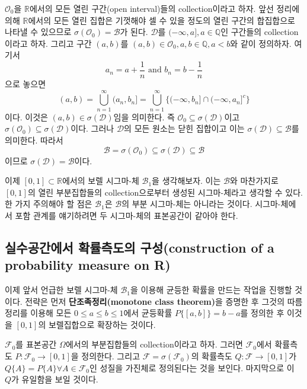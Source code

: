 \documentclass[b5paper,]{book}
\theoremstyle{definition}
\theoremstyle{definition}
\theoremstyle{definition}
\theoremstyle{remark}
\let\BeginKnitrBlock\begin \let\EndKnitrBlock\end
\begin{document}
\BeginKnitrBlock{exercise}[실수 구간에서의 보렐 시그마-체의 생성의 증명]
\protect\hypertarget{exr:unnamed-chunk-32}{}{\label{exr:unnamed-chunk-32}
{}
}\(\mathcal{O}_{0}\)을 \(\mathbb{R}\)에서의 모든 열린 구간(open
interval)들의 collection이라고 하자. 앞선 정리에 의해
\(\mathbb{R}\)에서의 모든 열린 집합은 기껏해야 셀 수 있을 정도의 열린
구간의 합집합으로 나타낼 수 있으므로
\(\sigma(\mathcal{O}_{0})=\mathcal{B}\)가 된다. \(\mathcal{D}\)를
\((-\infty, a], a\in \mathbb{Q}\)인 구간들의 collection이라고 하자.
그리고 구간 \((a,b)\)를
\((a,b)\in \mathcal{O}_{0}, a,b \in \mathbb{Q}, a<b\)와 같이 정의하자.
여기서 \[a_{n}=a+\frac{1}{n} \text{ and } b_{n}=b-\frac{1}{n}\] 으로
놓으면
\[(a,b)=\bigcup_{n=1}^{\infty}(a_{n},b_{n}]=\bigcup_{n=1}^{\infty}\{ (-\infty, b_{n}] \cap (-\infty, a_{n}]^{c}\}\]
이다. 이것은 \((a,b)\in \sigma (\mathcal{D})\)임을 의미한다. 즉
\(\mathcal{O}_{0}\subseteq \sigma(\mathcal{D})\)이고
\(\sigma(\mathcal{O}_{0})\subseteq \sigma(\mathcal{D})\)이다. 그러나
\(\mathcal{D}\)의 모든 원소는 닫힌 집합이고 이는
\(\sigma(\mathcal{D})\subseteq \mathcal{B}\)를 의미한다. 따라서
\[\mathcal{B} = \sigma(\mathcal{O}_{0})\subseteq \sigma(\mathcal{D})\subseteq \mathcal{B}\]
이므로 \(\sigma(\mathcal{D})=\mathcal{B}\)이다.
\EndKnitrBlock{exercise}

이제 \([0,1]\subset \mathbb{R}\)에서의 보렐 시그마-체
\(\mathcal{B}_{1}\)을 생각해보자. 이는 \(\mathcal{B}\)와 마찬가지로
\([0,1]\)의 열린 부분집합들의 collection으로부터 생성된 시그마-체라고
생각할 수 있다. 한 가지 주의해야 할 점은 \(\mathcal{B}_{1}\)은
\(\mathcal{B}\)의 부분 시그마-체는 아니라는 것이다. 시그마-체에서 포함
관계를 얘기하려면 두 시그마-체의 표본공간이 같아야 한다.

\subsection{실수공간에서 확률측도의 구성(construction of a probability
measure on R)}\label{--construction-of-a-probability-measure-on-r}

이제 앞서 언급한 보렐 시그마-체 \(\mathcal{B}_{1}\)을 이용해 균등한
확률을 만드는 작업을 진행할 것이다. 전략은 먼저
\textbf{단조족정리(monotone class theorem)}을 증명한 후 그것의
따름정리를 이용해 모든 \(0\leq a \leq b \leq 1\)에서 균등확률
\(P\{[a,b]\}=b-a\)를 정의한 후 이것을 \([0,1]\)의 보렐집합으로 확장하는
것이다.

\(\mathcal{F}_{0}\)를 표본공간 \(\Omega\)에서의 부분집합들의
collection이라고 하자. 그러면 \(\mathcal{F}_{0}\)에서 확률측도
\(P:\mathcal{F}_{0} \rightarrow [0,1]\)을 정의한다. 그리고
\(\mathcal{F}=\sigma(\mathcal{F}_{0})\)의 확률측도
\(Q:\mathcal{F} \rightarrow [0,1]\)가
\(Q\{A\}=P\{A\} \forall A\in \mathcal{F}_{0}\)인 성질을 가진체로
정의된다는 것을 보인다. 마지막으로 이 \(Q\)가 유일함을 보일 것이다.
\end{document}
